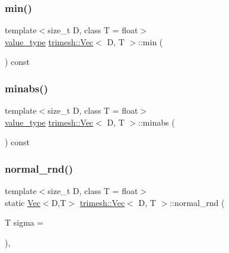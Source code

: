 \mbox{\label{classtrimesh_1_1Vec_af1ca2c6c13e85d5b519d7cfb2d8e22d1}} 
\subsubsection{\texorpdfstring{min()}{min()}\hspace{0.1cm}{\footnotesize\ttfamily [3/3]}}
{\footnotesize\ttfamily template$<$size\+\_\+t D, class T = float$>$ \\
\hyperlink{classtrimesh_1_1Vec_a10a59253996e42d67c713f37592669df}{value\+\_\+type} \hyperlink{classtrimesh_1_1Vec}{trimesh\+::\+Vec}$<$ D, T $>$\+::min (\begin{DoxyParamCaption}{ }\end{DoxyParamCaption}) const\hspace{0.3cm}{\ttfamily [inline]}}

\mbox{\label{classtrimesh_1_1Vec_a4b4a9852bd70e8e90054dbf08264129e}} 
\subsubsection{\texorpdfstring{minabs()}{minabs()}}
{\footnotesize\ttfamily template$<$size\+\_\+t D, class T = float$>$ \\
\hyperlink{classtrimesh_1_1Vec_a10a59253996e42d67c713f37592669df}{value\+\_\+type} \hyperlink{classtrimesh_1_1Vec}{trimesh\+::\+Vec}$<$ D, T $>$\+::minabs (\begin{DoxyParamCaption}{ }\end{DoxyParamCaption}) const\hspace{0.3cm}{\ttfamily [inline]}}

\mbox{\label{classtrimesh_1_1Vec_afaa4d37120f8c61294c4b674891f3f9e}} 
\subsubsection{\texorpdfstring{normal\+\_\+rnd()}{normal\_rnd()}}
{\footnotesize\ttfamily template$<$size\+\_\+t D, class T = float$>$ \\
static \hyperlink{classtrimesh_1_1Vec}{Vec}$<$D,T$>$ \hyperlink{classtrimesh_1_1Vec}{trimesh\+::\+Vec}$<$ D, T $>$\+::normal\+\_\+rnd (\begin{DoxyParamCaption}\item[{T}]{sigma = {} }\end{DoxyParamCaption})\hspace{0.3cm}{\ttfamily [inline]}, {\ttfamily [static]}}

